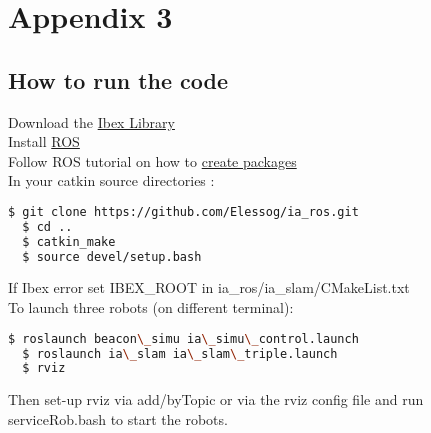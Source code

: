 \documentclass[12pt]{report} %
\begin{document}
\chapter{Appendix 3}

\section*{How to run the code}


Download the \href{http://www.ibex-lib.org/}{Ibex Library}\\

Install \href{http://wiki.ros.org/indigo/Installation}{ROS}\\

Follow ROS tutorial on how to \href{http://wiki.ros.org/ROS/Tutorials/catkin/CreatingPackage}{create packages}\\

In your catkin source directories :\\

\begin{lstlisting}[language=bash]
  $ git clone https://github.com/Elessog/ia_ros.git
  $ cd ..
  $ catkin_make
  $ source devel/setup.bash
\end{lstlisting}

If Ibex error set IBEX\_ROOT in ia\_ros/ia\_slam/CMakeList.txt\\

To launch three robots (on different terminal):

\begin{lstlisting}[language=bash]
  $ roslaunch beacon\_simu ia\_simu\_control.launch
  $ roslaunch ia\_slam ia\_slam\_triple.launch 
  $ rviz
\end{lstlisting}

Then set-up rviz via add/byTopic or via the rviz config file and run serviceRob.bash to start the robots.


%


\nocite{*}




\end{document}
